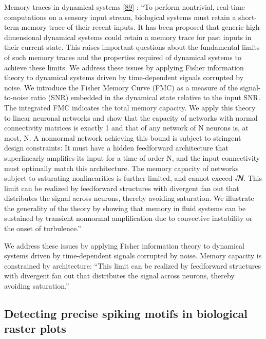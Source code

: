 Memory traces in dynamical systems {[}\protect\hyperlink{ref-o7rANZux}{89}{]} : ``To perform nontrivial, real-time computations on a sensory input stream, biological systems must retain a short-term memory trace of their recent inputs. It has been proposed that generic high-dimensional dynamical systems could retain a memory trace for past inputs in their current state. This raises important questions about the fundamental limits of such memory traces and the properties required of dynamical systems to achieve these limits. We address these issues by applying Fisher information theory to dynamical systems driven by time-dependent signals corrupted by noise. We introduce the Fisher Memory Curve (FMC) as a measure of the signal-to-noise ratio (SNR) embedded in the dynamical state relative to the input SNR. The integrated FMC indicates the total memory capacity. We apply this theory to linear neuronal networks and show that the capacity of networks with normal connectivity matrices is exactly 1 and that of any network of N neurons is, at most, N. A nonnormal network achieving this bound is subject to stringent design constraints: It must have a hidden feedforward architecture that superlinearly amplifies its input for a time of order N, and the input connectivity must optimally match this architecture. The memory capacity of networks subject to saturating nonlinearities is further limited, and cannot exceed √𝑁. This limit can be realized by feedforward structures with divergent fan out that distributes the signal across neurons, thereby avoiding saturation. We illustrate the generality of the theory by showing that memory in fluid systems can be sustained by transient nonnormal amplification due to convective instability or the onset of turbulence.''

We address these issues by applying Fisher information theory to dynamical systems driven by time-dependent signals corrupted by noise. Memory capacity is constrained by architecture: ``This limit can be realized by feedforward structures with divergent fan out that distributes the signal across neurons, thereby avoiding saturation.''

\hypertarget{detecting-precise-spiking-motifs-in-biological-raster-plots}{%
\subsection{Detecting precise spiking motifs in biological raster plots}\label{detecting-precise-spiking-motifs-in-biological-raster-plots}}


